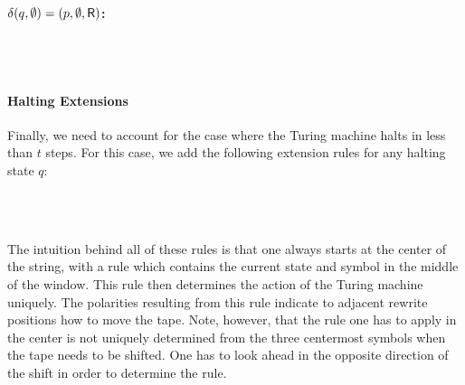 \documentclass[a4paper,UKenglish,cleveref, autoref]{lipics-v2019}
\begin{document}
\paragraph*{$\delta(q, \emptyset) = (p, \emptyset, \textsf{R})$:}
\begin{center}
   \\[3ex]
   \\[3ex]
\end{center}

\paragraph*{Halting Extensions}
Finally, we need to account for the case where the Turing machine halts in less than $t$ steps. For this case, we add the following extension rules for any halting state $q$: 
\begin{center}
   \\[3ex]
   \\[3ex]
\end{center}
\vspace{7ex}
The intuition behind all of these rules is that one always starts at the center of the string, with a rule which contains the current state and symbol in the middle of the window. This rule then determines the action of the Turing machine uniquely. The polarities resulting from this rule indicate to adjacent rewrite positions how to move the tape. Note, however, that the rule one has to apply in the center is not uniquely determined from the three centermost symbols when the tape needs to be shifted. One has to look ahead in the opposite direction of the shift in order to determine the rule. 
\end{document}
